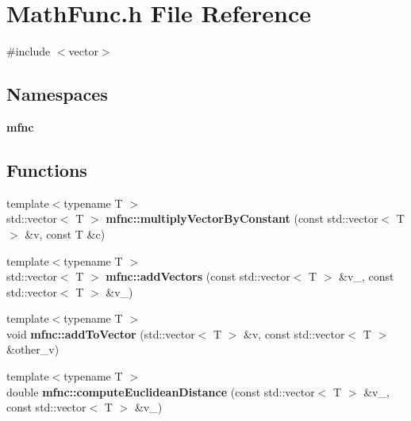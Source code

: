 \section{Math\+Func.\+h File Reference}
\label{_math_func_8h}
{\ttfamily \#include $<$vector$>$}\newline
\subsection*{Namespaces}
\begin{DoxyCompactItemize}
\item 
 \textbf{ mfnc}
\end{DoxyCompactItemize}
\subsection*{Functions}
\begin{DoxyCompactItemize}
\item 
{\footnotesize template$<$typename T $>$ }\\std\+::vector$<$ T $>$ \textbf{ mfnc\+::multiply\+Vector\+By\+Constant} (const std\+::vector$<$ T $>$ \&v, const T \&c)
\item 
{\footnotesize template$<$typename T $>$ }\\std\+::vector$<$ T $>$ \textbf{ mfnc\+::add\+Vectors} (const std\+::vector$<$ T $>$ \&v\+\_, const std\+::vector$<$ T $>$ \&v\+\_)
\item 
{\footnotesize template$<$typename T $>$ }\\void \textbf{ mfnc\+::add\+To\+Vector} (std\+::vector$<$ T $>$ \&v, const std\+::vector$<$ T $>$ \&other\+\_\+v)
\item 
{\footnotesize template$<$typename T $>$ }\\double \textbf{ mfnc\+::compute\+Euclidean\+Distance} (const std\+::vector$<$ T $>$ \&v\+\_, const std\+::vector$<$ T $>$ \&v\+\_)
\end{DoxyCompactItemize}
